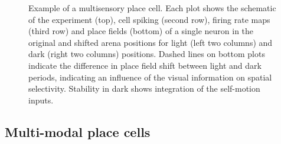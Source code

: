 \begin{figure}
\captionsetup{format=plain}
\caption[Multisensory Cells]{
Example of a multisensory place cell. Each plot shows the schematic of the experiment (top), cell spiking (second row), firing rate maps (third row) and place fields (bottom) of a single neuron in the original and shifted arena positions for light (left two columns) and dark (right two columns) positions. Dashed lines on bottom plots indicate the difference in place field shift between light and dark periods, indicating an influence of the visual information on spatial selectivity. Stability in dark shows integration of the self-motion inputs.
}
\label{fig:F13_multisensory_cells}
\end{figure}


\subsection{Multi-modal place cells}

